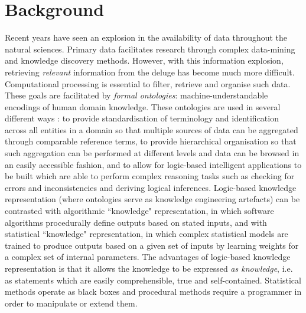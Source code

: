 \documentclass[10pt]{bmc_article}
\newenvironment{bmcformat}{\baselineskip20pt\sloppy\setboolean{publ}{false}}{\baselineskip20pt\sloppy}
\begin{document}
\begin{bmcformat}
\section*{Background}

Recent years have seen an explosion in the availability of data throughout the natural sciences. Primary data facilitates research through complex data-mining and knowledge discovery methods. However, with this information explosion, retrieving \textit{relevant} information from the deluge has become much more difficult. Computational processing is essential to filter, retrieve and organise such data. These goals are facilitated by \textit{formal ontologies}: machine-understandable encodings of human domain knowledge. These ontologies are used in several different ways \cite{lambrix2004}: to provide standardisation of terminology and identification across all entities in a domain so that multiple sources of data can be aggregated through comparable reference terms, to provide hierarchical organisation so that such aggregation can be performed at different levels and data can be browsed in an easily accessible fashion, and to allow for logic-based intelligent applications to be built which are able to perform complex reasoning tasks such as checking for errors and inconsistencies and deriving logical inferences. Logic-based knowledge representation (where ontologies serve as knowledge engineering artefacts) can be contrasted with algorithmic ``knowledge" representation, in which software algorithms procedurally define outputs based on stated inputs, and with statistical ``knowledge" representation, in which complex statistical models are trained to produce outputs based on a given set of inputs by learning weights for a complex set of internal parameters.  The advantages of logic-based knowledge representation is that it allows the knowledge to be expressed \textit{as knowledge}, i.e. as statements which are easily comprehensible, true and self-contained.  Statistical methods operate as black boxes and procedural methods require a programmer in order to manipulate or extend them. 


\end{bmcformat}
\end{document}
